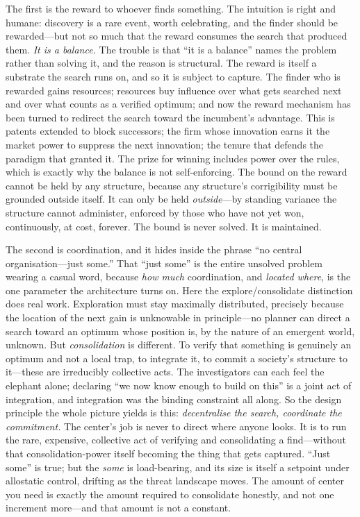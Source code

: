 \documentclass{article}
\begin{document}
The first is the reward to whoever finds something. The intuition is right and humane: discovery is a rare event, worth celebrating, and the finder should be rewarded---but not so much that the reward consumes the search that produced them. \textit{It is a balance.} The trouble is that ``it is a balance'' names the problem rather than solving it, and the reason is structural. The reward is itself a substrate the search runs on, and so it is subject to capture. The finder who is rewarded gains resources; resources buy influence over what gets searched next and over what counts as a verified optimum; and now the reward mechanism has been turned to redirect the search toward the incumbent's advantage. This is patents extended to block successors; the firm whose innovation earns it the market power to suppress the next innovation; the tenure that defends the paradigm that granted it. The prize for winning includes power over the rules, which is exactly why the balance is not self-enforcing. The bound on the reward cannot be held by any structure, because any structure's corrigibility must be grounded outside itself. It can only be held \textit{outside}---by standing variance the structure cannot administer, enforced by those who have not yet won, continuously, at cost, forever. The bound is never solved. It is maintained.

The second is coordination, and it hides inside the phrase ``no central organisation---just some.'' That ``just some'' is the entire unsolved problem wearing a casual word, because \textit{how much} coordination, and \textit{located where}, is the one parameter the architecture turns on. Here the explore/consolidate distinction does real work. Exploration must stay maximally distributed, precisely because the location of the next gain is unknowable in principle---no planner can direct a search toward an optimum whose position is, by the nature of an emergent world, unknown. But \textit{consolidation} is different. To verify that something is genuinely an optimum and not a local trap, to integrate it, to commit a society's structure to it---these are irreducibly collective acts. The investigators can each feel the elephant alone; declaring ``we now know enough to build on this'' is a joint act of integration, and integration was the binding constraint all along. So the design principle the whole picture yields is this: \textit{decentralise the search, coordinate the commitment.} The center's job is never to direct where anyone looks. It is to run the rare, expensive, collective act of verifying and consolidating a find---without that consolidation-power itself becoming the thing that gets captured. ``Just some'' is true; but the \textit{some} is load-bearing, and its size is itself a setpoint under allostatic control, drifting as the threat landscape moves. The amount of center you need is exactly the amount required to consolidate honestly, and not one increment more---and that amount is not a constant.
\end{document}
